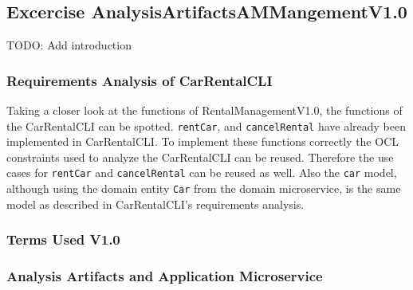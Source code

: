 \subsection{Excercise AnalysisArtifactsAMMangementV1.0}
TODO: Add introduction
\subsubsection*{Requirements Analysis of CarRentalCLI}
Taking a closer look at the functions of RentalManagementV1.0, the functions of the CarRentalCLI can be spotted.
\texttt{rentCar}, and \texttt{cancelRental} have already been implemented in CarRentalCLI.
To implement these functions correctly the OCL constraints used to analyze the CarRentalCLI can be reused.
Therefore the use cases for \texttt{rentCar} and \texttt{cancelRental} can be reused as well.
Also the \texttt{car} model, although using the domain entity \texttt{Car} from the domain microservice, is the same model as described in CarRentalCLI's requirements analysis.
\subsubsection*{Terms Used V1.0}

\subsubsection*{Analysis Artifacts and Application Microservice}